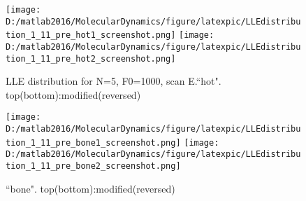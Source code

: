 \documentclass[aps,pre,twocolumn,groupedaddress]{revtex4-1}
\begin{document}
\begin{comment}
\begin{figure}[hbtp]
\centering
\texttt{[image: D:/matlab2016/MolecularDynamics/figure/latexpic/C\_N=5\_LLEevolution\_F0=1000\_E=3000\_2.eps]}
\texttt{[image: D:/matlab2016/MolecularDynamics/figure/latexpic/C\_N=5\_Energy\_F0=1000\_E=3000\_2.eps]} 
\caption{N=5, F0=1000, E=3000, Gaussian interaction}
\label{fig:LLEexample1}
\end{figure}
\begin{figure}[hbtp]
\centering
\texttt{[image: D:/matlab2016/MolecularDynamics/figure/latexpic/C\_N=5\_LLEevolution\_F0=1000\_E=10000\_1.eps]}
\caption{N=5, F0=1000, E=10000, Gaussian interaction}
\label{fig:LLEexample2}
\end{figure}
\begin{figure}[hbtp]
\centering
\texttt{[image: D:/matlab2016/MolecularDynamics/figure/latexpic/C\_N=5\_LLEevolution\_F0=1000\_E=100000\_1.eps]}
\caption{N=5, F0=1000, E=100000, Gaussian interaction}
\label{fig:LLEexample3}
\end{figure}

Fig.\ref{fig:LLEexample1}, fig.\ref{fig:LLEexample2} and fig.\ref{fig:LLEexample3} serve as examples showing the way I measure LLE: I integrate and average the LLE along the trajectory, usually over 100-1000 time unit, the LLE converge to certain stable value, and then I start another LLE measurement. \textbf{From the examples above, one may judge how good the convergence is and how big the error of LLE measurement can be.}
\end{comment}


\begin{figure}[hbtp]
\centering
\texttt{[image: D:/matlab2016/MolecularDynamics/figure/latexpic/LLEdistribution\_1\_11\_pre\_hot1\_screenshot.png]}
\texttt{[image: D:/matlab2016/MolecularDynamics/figure/latexpic/LLEdistribution\_1\_11\_pre\_hot2\_screenshot.png]}
\caption{LLE distribution for N=5, F0=1000, scan E.``hot". top(bottom):modified(reversed)}
\end{figure}
\begin{figure}[hbtp]
\centering
\texttt{[image: D:/matlab2016/MolecularDynamics/figure/latexpic/LLEdistribution\_1\_11\_pre\_bone1\_screenshot.png]}
\texttt{[image: D:/matlab2016/MolecularDynamics/figure/latexpic/LLEdistribution\_1\_11\_pre\_bone2\_screenshot.png]}
\caption{``bone". top(bottom):modified(reversed)}
\end{figure}
\end{document}
